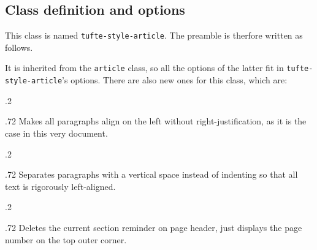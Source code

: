 \documentclass[raggedright, twoside, 11pt, colorful]{tufte-style-article}
\begin{document}
\subsection{Class definition and options}

This class is named \texttt{tufte-style-article}. The preamble is therfore written as follows.

It is inherited from the \texttt{article} class, so all the options of the latter fit in \texttt{tufte-style-article}'s options. There are also new ones for this class, which are:

\medskip
\begin{minipagewithmarginpars}[t]{.2\textwidth}
	\raggedleft
\end{minipagewithmarginpars}\hfill%
\begin{minipagewithmarginpars}[t]{.72\textwidth}
	Makes all paragraphs align on the left without right-justification, as it is the case in this very document. \\
\end{minipagewithmarginpars}
\smallskip
\begin{minipagewithmarginpars}[t]{.2\textwidth}
	\raggedleft
\end{minipagewithmarginpars}\hfill%
\begin{minipagewithmarginpars}[t]{.72\textwidth}
	Separates paragraphs with a vertical space instead of indenting so that all text is rigorously left-aligned.
\end{minipagewithmarginpars}
\smallskip
\begin{minipagewithmarginpars}[t]{.2\textwidth}
	\raggedleft
\end{minipagewithmarginpars}\hfill%
\begin{minipagewithmarginpars}[t]{.72\textwidth}
	Deletes the current section reminder on page header, just displays the page number on the top outer corner.
\end{minipagewithmarginpars}
\end{document}
